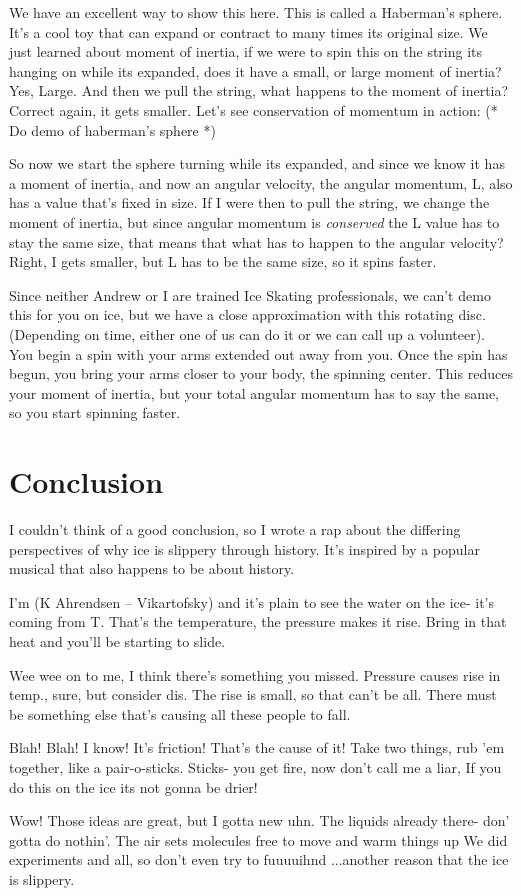 \documentclass[12pt]{article}
\begin{document}
We have an excellent way to show
this here. This is called a Haberman's sphere. It's a cool toy that can expand or contract
to many times its original size. We just learned about moment of inertia, if we were to spin 
this on the string its hanging on while its expanded, does it have a small, or large moment
of inertia? Yes, Large. And then we pull the string, what happens to the moment of inertia? 
Correct again, it gets smaller. Let's see conservation of momentum in action: 
(* Do demo of haberman's sphere *)

So now we start the sphere turning while its expanded, and since we know it has a moment of 
inertia, and now an angular velocity, the angular momentum, L, also has a value that's 
fixed in size. If I were then to pull the string, we change the moment of inertia, but since 
angular momentum is \emph{conserved} the L value has to stay the same size, that means that
what has to happen to the angular velocity? Right, I gets smaller, but L has to be the same
size, so it spins faster.

Since neither Andrew or I are trained Ice Skating professionals, we can't demo this for you 
on ice, but we have a close approximation with this rotating disc. (Depending on time, 
either one of us can do it or we can call up a volunteer). You begin a spin with your arms
extended out away from you. Once the spin has begun, you bring your arms closer 
to your body, the spinning center. This reduces your moment of inertia, but your total
angular momentum has to say the same, so you start spinning faster.

\section{Conclusion}
I couldn't think of a good conclusion, so I wrote a rap
about the differing perspectives of why ice is slippery 
through history. It's inspired by a popular musical that
also happens to be about history.

I'm (K Ahrendsen -- Vikartofsky) and it's plain to see 
the water on the ice- it's coming from T.
That's the temperature, the pressure makes it rise. 
Bring in that heat and you'll be starting to slide. 

Wee wee on to me, I think there's something you missed.
Pressure causes rise in temp., sure, but consider dis.
The rise is small, so that can't be all. 
There must be something else that's causing all these people to fall. 

Blah! Blah! I know! It's friction! That's the cause of it!
Take two things, rub 'em together, like a pair-o-sticks.
Sticks- you get fire, now don't call me a liar,
If you do this on the ice its not gonna be drier!

Wow! Those ideas are great, but I gotta new uhn.
The liquids already there- don' gotta do nothin'.
The air sets molecules free to move and warm things up
We did experiments and all, so don't even try to fuuuuihnd
...another reason that the ice is slippery.
\end{document}
